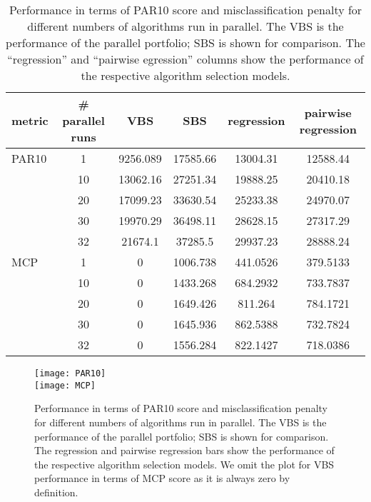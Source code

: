 \begin{table*}[htb]
\centering
\smallskip\begin{tabular}{l c c c c c} 
\toprule
metric & \# parallel runs & VBS & SBS & regression & pairwise regression\\
\midrule
PAR10 & 1 & 9256.089
 & 17585.66
 & 13004.31
 & 12588.44

 \\
& 10 & 13062.16
 & 27251.34
 & 19888.25
 & 20410.18

 \\
& 20 & 17099.23
 & 33630.54
 & 25233.38
 & 24970.07

 \\
& 30 & 19970.29
 & 36498.11
 & 28628.15
 & 27317.29

 \\
& 32 & 21674.1
 & 37285.5
 & 29937.23
 & 28888.24

\\ 
\midrule
MCP & 1 & 0 
& 1006.738 
& 441.0526 
& 379.5133
 \\
& 10 & 0 
& 1433.268 
& 684.2932 
& 733.7837
 \\
& 20 & 0 
& 1649.426 
& 811.264 
& 784.1721
 \\
& 30 & 0 
& 1645.936 
& 862.5388 
& 732.7824
 \\
& 32 & 0 
& 1556.284 
& 822.1427 
& 718.0386
\\
\bottomrule
\end{tabular}
\small \caption[PAR10 and MCP Performance Analysis: Comparing Algorithm Selection and Parallel Execution]{Performance in terms of PAR10 score and misclassification penalty for different numbers of algorithms run in parallel. The VBS is the performance of the parallel portfolio; SBS is shown for comparison. The ``regression'' and ``pairwise egression'' columns show the performance of the respective algorithm selection models.}
\label{tab:values}
\end{table*}

\begin{figure*}[htb]
    \setlength{\parindent}{0pt}
    \centering
    \texttt{[image: PAR10]}\\
    \texttt{[image: MCP]}
\small \caption[PAR10 and MCP Performance Analysis: Comparing Algorithm Selection and Parallel Execution]{Performance in terms of PAR10 score and misclassification penalty for different numbers of algorithms run in parallel. The VBS is the performance of the parallel portfolio; SBS is shown for comparison. The regression and pairwise regression bars show the performance of the respective algorithm selection models. We omit the plot for VBS performance in terms of MCP score as it is always zero by definition.}
    \label{fig:values}
\end{figure*}

